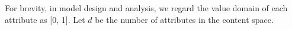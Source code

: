 \documentclass[runningheads]{llncs}
\begin{document}
For brevity, in model design and analysis, we regard the value domain of each attribute as [0, 1]. Let $d$ be the number of attributes in the content space. 
\end{document}
